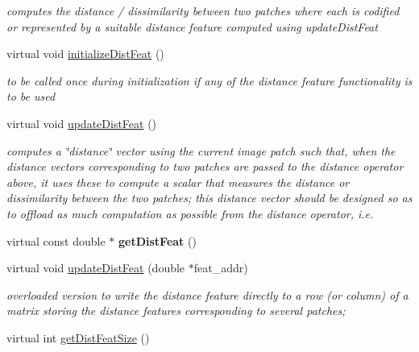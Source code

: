 \begin{DoxyCompactItemize}
\begin{DoxyCompactList}\small\item\em computes the distance / dissimilarity between two patches where each is codified or represented by a suitable distance feature computed using update\-Dist\-Feat \end{DoxyCompactList}\item 
\hypertarget{classAppearanceModel_a04b3f66700a863ec171b12e8d016065b}{virtual void \hyperlink{classAppearanceModel_a04b3f66700a863ec171b12e8d016065b}{initialize\-Dist\-Feat} ()}\label{classAppearanceModel_a04b3f66700a863ec171b12e8d016065b}

\begin{DoxyCompactList}\small\item\em to be called once during initialization if any of the distance feature functionality is to be used \end{DoxyCompactList}\item 
virtual void \hyperlink{classAppearanceModel_afc815587980df0cd28412a2cd1670854}{update\-Dist\-Feat} ()
\begin{DoxyCompactList}\small\item\em computes a \char`\"{}distance\char`\"{} vector using the current image patch such that, when the distance vectors corresponding to two patches are passed to the distance operator above, it uses these to compute a scalar that measures the distance or dissimilarity between the two patches; this distance vector should be designed so as to offload as much computation as possible from the distance operator, i.\-e. \end{DoxyCompactList}\item 
\hypertarget{classAppearanceModel_a205dc9e522814207caab3f243acba87a}{virtual const double $\ast$ {\bfseries get\-Dist\-Feat} ()}\label{classAppearanceModel_a205dc9e522814207caab3f243acba87a}

\item 
\hypertarget{classAppearanceModel_aa01514bdfceaeaed207ac279c3f10afa}{virtual void \hyperlink{classAppearanceModel_aa01514bdfceaeaed207ac279c3f10afa}{update\-Dist\-Feat} (double $\ast$feat\-\_\-addr)}\label{classAppearanceModel_aa01514bdfceaeaed207ac279c3f10afa}

\begin{DoxyCompactList}\small\item\em overloaded version to write the distance feature directly to a row (or column) of a matrix storing the distance features corresponding to several patches; \end{DoxyCompactList}\item 
\hypertarget{classAppearanceModel_affa40a42a35edc8dd1d2d06344013315}{virtual int \hyperlink{classAppearanceModel_affa40a42a35edc8dd1d2d06344013315}{get\-Dist\-Feat\-Size} ()}\label{classAppearanceModel_affa40a42a35edc8dd1d2d06344013315}


\end{DoxyCompactItemize}
